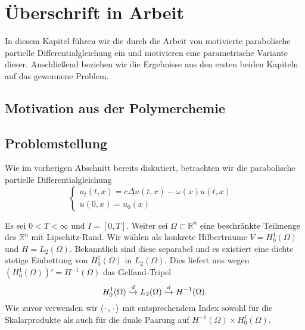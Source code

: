 
\chapter{Überschrift in Arbeit}

In diesem Kapitel führen wir die durch die Arbeit von \textcite{Stasiak:2011ba} motivierte parabolische partielle Differentialgleichung ein und motivieren eine parametrische Variante dieser.
Anschließend beziehen wir die Ergebnisse aus den ersten beiden Kapiteln auf das gewonnene Problem.

\section{Motivation aus der Polymerchemie} %
\label{sec:motivation}

\blindtext

\blindtext


\section{Problemstellung} %
\label{sub:problemstellung}

Wie im vorherigen Abschnitt bereits diskutiert, betrachten wir die parabolische partielle Differentialgleichung
\begin{equation}
    \begin{cases}
        u_{t}(t, x) = c \Delta u(t, x) - \omega(x) u(t, x) &\\
        u(0, x) = u_0(x) &
    \end{cases}
\end{equation}

Es sei $0 < T < \infty$ und $I = [0, T]$.
Weiter sei $\Omega \subset \mathbb{R}^{n}$ eine beschränkte Teilmenge des $\mathbb{R}^{n}$ mit Lipschitz-Rand.
Wir wählen als konkrete Hilberträume $V = H^{1}_{0}(\Omega)$ und $H = L_{2}(\Omega)$.
Bekanntlich sind diese separabel und es existiert eine dichte stetige Einbettung von $H^{1}_{0}(\Omega)$ in $L_{2}(\Omega)$.
Dies liefert uns wegen $(H^{1}_{0}(\Omega))' = H^{-1}(\Omega)$ das Gelfand-Tripel
\begin{equation}
    H^{1}_{0}(\Omega) \stackrel{d}{\hookrightarrow} L_{2}(\Omega) \stackrel{d}{\hookrightarrow} H^{-1}(\Omega).
\end{equation}
Wie zuvor verwenden wir $\left\langle{\mkern2mu\cdot\mkern2mu},{\mkern2mu\cdot\mkern2mu}\right\rangle$ mit entsprechendem Index sowohl für die Skalarprodukte als auch für die duale Paarung auf $H^{-1}(\Omega) \times H^{1}_{0}(\Omega)$.

